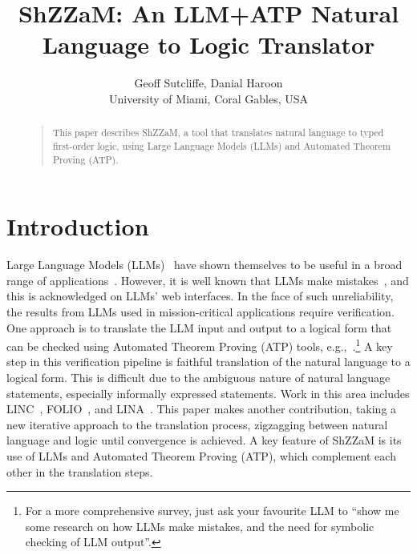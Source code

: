 \documentclass[letterpaper]{article}
\begin{document}
\title{ShZZaM: An LLM+ATP Natural Language to Logic Translator}
\author{Geoff Sutcliffe, Danial Haroon\\
University of Miami,
Coral Gables, USA
}
\maketitle
\begin{abstract}
\begin{quote}
This paper describes ShZZaM, a tool that translates natural language to typed first-order logic, 
using Large Language Models (LLMs) and Automated Theorem Proving (ATP).
\end{quote}
\end{abstract}
\section{Introduction}

Large Language Models (LLMs)~\cite{PR+25} have shown themselves to be useful in a broad range
of applications~\cite{MK+25}.
However, it is well known that LLMs make mistakes~\cite{HY+25}, and this is acknowledged on 
LLMs' web interfaces.
In the face of such unreliability, the results from LLMs used in mission-critical applications 
require verification.
One approach is to translate the LLM input and output to a logical form that can be checked
using Automated Theorem Proving (ATP) tools, e.g.,~\cite{YS+25,CL+25}.\footnote{%
For a more comprehensive survey, just ask your favourite LLM to ``show me some research on how LLMs 
make mistakes, and the need for symbolic checking of LLM output''.}
A key step in this verification pipeline is faithful translation of the natural language to
a logical form.
This is difficult due to the ambiguous nature of natural language statements, especially
informally expressed statements.
Work in this area includes LINC~\cite{OG+23}, FOLIO~\cite{HS+24}, and LINA~\cite{LL+24-arXiv}.
This paper makes another contribution, taking a new iterative approach to the translation
process, zigzagging between natural language and logic until convergence is achieved.
A key feature of ShZZaM is its use of LLMs and Automated Theorem Proving (ATP), which
complement each other in the translation steps.
\end{document}
